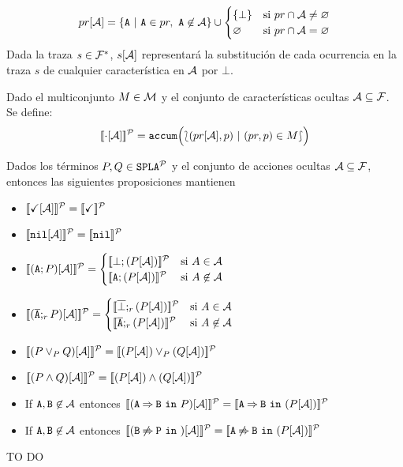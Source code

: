   \begin{displaymath}
    pr[{\cal A}] = \{{\mathtt{A}}\ |\ {\mathtt{A}}\in pr,\
    {\mathtt{A}}\not\in{\cal A}\}\cup
    \begin{cases}
      \{\bot\} & \mbox{si } pr\cap{\cal A}\neq\varnothing\\
      \varnothing & \mbox{si } pr\cap{\cal A}=\varnothing\\
    \end{cases}
  \end{displaymath}
  Dada la traza $s\in{\cal F}^{*}$, $s[{\cal A}]$ representará la substitución
  de cada ocurrencia en la traza $s$ de cualquier característica en ${\cal A}$ por $\bot$.
\edfn

\bdfn
  Dado el multiconjunto $M\in{\cal M}$ y el conjunto de características ocultas ${\cal A}\subseteq{\cal F}$. Se define:
  \begin{displaymath}
    [\![\cdot[{\cal A}]]\!]^{\cal P} = \mathtt{accum}\Bigl(\lbag(pr[{\cal A}],p)\
    |\ (pr,p)\in M\rbag \Bigr)
  \end{displaymath}
\edfn

\bprop
  Dados los términos $P,Q\in\mathtt{SPLA{^{\cal P}}}$ y el conjunto de acciones ocultas ${\cal A}\subseteq{\cal F}$, entonces
  las siguientes proposiciones mantienen
  \begin{itemize}
  \item $[\![\checkmark[{\cal A}]]\!]^{\cal P}=[\![\checkmark]\!]^{\cal P}$
  \item $[\![\mathtt{nil}[{\cal A}]]\!]^{\cal P}=[\![\mathtt{nil}]\!]^{\cal P}$
  \item
      $\semdenp{(\fA;P)\hide\calA}=
      \begin{cases}
        \semdenp{\bot;(P\hide\calA)} & \mbox{si } A\in\calA\\
        \semdenp{\fA;(P\hide\calA)} & \mbox{si } A\not\in\calA\\
      \end{cases}$
  \item
      $\semdenp{(\ofA;_rP)\hide\calA}=
      \begin{cases}
        \semdenp{\overline{\bot};_r(P\hide\calA)} & \mbox{si } A\in\calA\\
        \semdenp{\ofA;_r(P\hide\calA)} & \mbox{si } A\not\in\calA\\
      \end{cases}$
  \item $[\![(P\mathbin{\lor}_P Q)[{\cal A}]]\!]^{\cal P}=[\![(P[{\cal A}])\mathbin{\lor}_P (Q[{\cal A}])]\!]^{\cal P}$
  \item $[\![(P\mathbin{\wedge} Q)[{\cal A}]]\!]^{\cal P}=[\![(P[{\cal A}])\mathbin{\wedge} (Q[{\cal A}])]\!]^{\cal P}$
  \item If ${\mathtt{A}},{\mathtt{B}}\not\in{\cal A}$ entonces 
    $[\![(\mathtt{A}\mathbin{\Rightarrow}\mathtt{B}\ \mathtt{in}\ P)[{\cal A}]]\!]^{\cal P}=[\![\mathtt{A}\mathbin{\Rightarrow}\mathtt{B}\ \mathtt{in}\ (P[{\cal A}])]\!]^{\cal P}$
  \item If ${\mathtt{A}},{\mathtt{B}}\not\in{\cal A}$ entonces 
    $[\![(\mathtt{B}\mathbin{\not\Rightarrow}\mathtt{P}\ \mathtt{in}\ )[{\cal A}]]\!]^{\cal P}=[\![\mathtt{A}\mathbin{\not\Rightarrow}\mathtt{B}\ \mathtt{in}\ (P[{\cal A}])]\!]^{\cal P}$
  \end{itemize}
  \bprf
    TO DO 
  \eprf
\eprop

